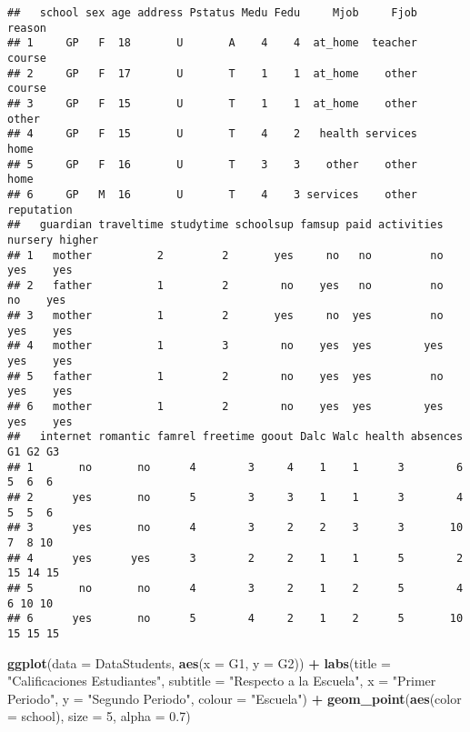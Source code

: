 \documentclass[
]{article}
\newenvironment{Shaded}{\begin{snugshade}}{\end{snugshade}}
\newcommand{\DataTypeTok}[1]{\textcolor[rgb]{0.13,0.29,0.53}{#1}}
\newcommand{\DecValTok}[1]{\textcolor[rgb]{0.00,0.00,0.81}{#1}}
\newcommand{\FloatTok}[1]{\textcolor[rgb]{0.00,0.00,0.81}{#1}}
\newcommand{\KeywordTok}[1]{\textcolor[rgb]{0.13,0.29,0.53}{\textbf{#1}}}
\newcommand{\NormalTok}[1]{#1}
\newcommand{\OperatorTok}[1]{\textcolor[rgb]{0.81,0.36,0.00}{\textbf{#1}}}
\newcommand{\StringTok}[1]{\textcolor[rgb]{0.31,0.60,0.02}{#1}}
\begin{document}
\begin{verbatim}
##   school sex age address Pstatus Medu Fedu     Mjob     Fjob     reason
## 1     GP   F  18       U       A    4    4  at_home  teacher     course
## 2     GP   F  17       U       T    1    1  at_home    other     course
## 3     GP   F  15       U       T    1    1  at_home    other      other
## 4     GP   F  15       U       T    4    2   health services       home
## 5     GP   F  16       U       T    3    3    other    other       home
## 6     GP   M  16       U       T    4    3 services    other reputation
##   guardian traveltime studytime schoolsup famsup paid activities nursery higher
## 1   mother          2         2       yes     no   no         no     yes    yes
## 2   father          1         2        no    yes   no         no      no    yes
## 3   mother          1         2       yes     no  yes         no     yes    yes
## 4   mother          1         3        no    yes  yes        yes     yes    yes
## 5   father          1         2        no    yes  yes         no     yes    yes
## 6   mother          1         2        no    yes  yes        yes     yes    yes
##   internet romantic famrel freetime goout Dalc Walc health absences G1 G2 G3
## 1       no       no      4        3     4    1    1      3        6  5  6  6
## 2      yes       no      5        3     3    1    1      3        4  5  5  6
## 3      yes       no      4        3     2    2    3      3       10  7  8 10
## 4      yes      yes      3        2     2    1    1      5        2 15 14 15
## 5       no       no      4        3     2    1    2      5        4  6 10 10
## 6      yes       no      5        4     2    1    2      5       10 15 15 15
\end{verbatim}

\begin{Shaded}
\begin{Highlighting}[]
\KeywordTok{ggplot}\NormalTok{(}\DataTypeTok{data =}\NormalTok{ DataStudents, }\KeywordTok{aes}\NormalTok{(}\DataTypeTok{x =}\NormalTok{ G1, }\DataTypeTok{y =}\NormalTok{ G2)) }\OperatorTok{+}\StringTok{ }\KeywordTok{labs}\NormalTok{(}\DataTypeTok{title =} \StringTok{"Calificaciones Estudiantes"}\NormalTok{, }\DataTypeTok{subtitle =} \StringTok{"Respecto a la Escuela"}\NormalTok{,}
                                                        \DataTypeTok{x =} \StringTok{"Primer Periodo"}\NormalTok{, }\DataTypeTok{y =} \StringTok{"Segundo Periodo"}\NormalTok{, }\DataTypeTok{colour =} \StringTok{"Escuela"}\NormalTok{) }\OperatorTok{+}
\StringTok{  }\KeywordTok{geom_point}\NormalTok{(}\KeywordTok{aes}\NormalTok{(}\DataTypeTok{color =}\NormalTok{ school), }\DataTypeTok{size =} \DecValTok{5}\NormalTok{, }\DataTypeTok{alpha =} \FloatTok{0.7}\NormalTok{)}
\end{Highlighting}
\end{Shaded}
\end{document}
